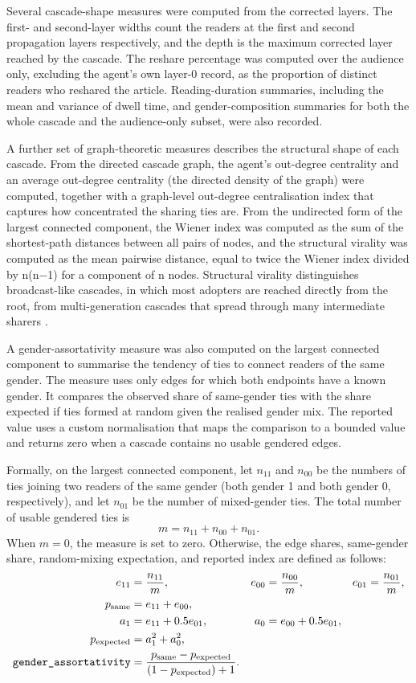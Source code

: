 Several cascade-shape measures were computed from the corrected layers. The first- and second-layer widths count the readers at the first and second propagation layers respectively, and the depth is the maximum corrected layer reached by the cascade. The reshare percentage was computed over the audience only, excluding the agent's own layer-0 record, as the proportion of distinct readers who reshared the article. Reading-duration summaries, including the mean and variance of dwell time, and gender-composition summaries for both the whole cascade and the audience-only subset, were also recorded.

A further set of graph-theoretic measures describes the structural shape of each cascade. From the directed cascade graph, the agent's out-degree centrality and an average out-degree centrality (the directed density of the graph) were computed, together with a graph-level out-degree centralisation index that captures how concentrated the sharing ties are. From the undirected form of the largest connected component, the Wiener index was computed as the sum of the shortest-path distances between all pairs of nodes, and the structural virality was computed as the mean pairwise distance, equal to twice the Wiener index divided by n(n−1) for a component of n nodes. Structural virality distinguishes broadcast-like cascades, in which most adopters are reached directly from the root, from multi-generation cascades that spread through many intermediate sharers \parencite{goel2016}.

A gender-assortativity measure was also computed on the largest connected component to summarise the tendency of ties to connect readers of the same gender. The measure uses only edges for which both endpoints have a known gender. It compares the observed share of same-gender ties with the share expected if ties formed at random given the realised gender mix. The reported value uses a custom normalisation that maps the comparison to a bounded value and returns zero when a cascade contains no usable gendered edges.

Formally, on the largest connected component, let \(n_{11}\) and \(n_{00}\) be the numbers of ties joining two readers of the same gender (both gender 1 and both gender 0, respectively), and let \(n_{01}\) be the number of mixed-gender ties. The total number of usable gendered ties is
\begin{equation}
m = n_{11} + n_{00} + n_{01}.
\end{equation}
When \(m = 0\), the measure is set to zero. Otherwise, the edge shares, same-gender share, random-mixing expectation, and reported index are defined as follows:
\begin{align}
e_{11} &= \frac{n_{11}}{m}, &
e_{00} &= \frac{n_{00}}{m}, &
e_{01} &= \frac{n_{01}}{m}, \\
p_{\mathrm{same}} &= e_{11} + e_{00}, \\
a_{1} &= e_{11} + 0.5 e_{01}, &
a_{0} &= e_{00} + 0.5 e_{01}, \\
p_{\mathrm{expected}} &= a_{1}^{2} + a_{0}^{2}, \\
\varname{gender\_assortativity}
&= \frac{p_{\mathrm{same}} - p_{\mathrm{expected}}}{(1 - p_{\mathrm{expected}}) + 1}.
\end{align}

